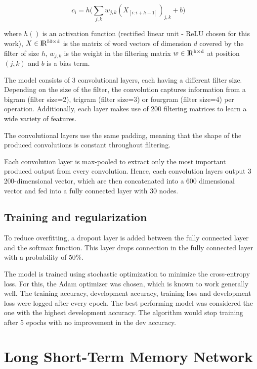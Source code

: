 \documentclass[10pt,conference,compsocconf]{IEEEtran}
\begin{document}
\begin {dmath} \label{eq:convolution}
c_i =  h \Big( \sum_{j,k} w_{j,k} (X_{[i:i+h-1]})_{j,k} + b \Big)
\end{dmath}

where $h()$ is an activation function (rectified linear unit - ReLU chosen for this work), $X \in \rm I\!R ^{50\times d}$ is the matrix of word vectors of dimension $d$ covered by the filter of size $h$, $w_{j,k}$ is the weight in the filtering matrix $w \in \rm I\!R ^{h \times d}$ at position $(j,k)$ and $b$ is a bias term.

The model consists of 3 convolutional layers, each having a different filter size. Depending on the size of the filter, the convolution captures information from a bigram (filter size=2), trigram (filter size=3) or fourgram (filter size=4) per operation. Additionally, each layer makes use of 200 filtering matrices to learn a wide variety of features.

The convolutional layers use the same padding, meaning that the shape of the produced convolutions is constant throughout filtering. 

Each convolution layer is max-pooled to extract only the most important produced output from every convolution. Hence, each convolution layers output 3 200-dimensional vector, which are then concatenated into a 600 dimensional vector and fed into a fully connected layer with 30 nodes.

\subsection{Training and regularization} \label{subsec:training_cnn}

To reduce overfitting, a dropout layer is added between the fully connected layer and the softmax function. This layer drops connection in the fully connected layer with a probability of $50\%$.

The model is trained using stochastic optimization to minimize the cross-entropy loss. For this, the Adam optimizer was chosen, which is known to work generally well. The training accuracy, development accuracy, training loss and development loss were logged after every epoch. The best performing model was considered the one with the highest development accuracy. The algorithm would stop training after 5 epochs with no improvement in the dev accuracy.

\section{Long Short-Term Memory Network} 
\label{sec:LSTM}
\end{document}
